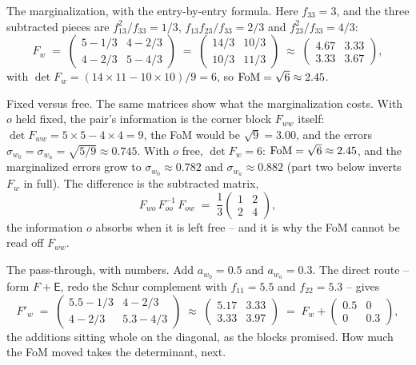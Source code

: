 \documentclass[11pt]{article}
\begin{document}
The marginalization, with the entry-by-entry formula.  Here
$f_{33} = 3$, and the three subtracted pieces are
$f_{13}^2/f_{33} = 1/3$, $f_{13}f_{23}/f_{33} = 2/3$ and
$f_{23}^2/f_{33} = 4/3$:
\begin{equation*}
  F_w \;=\;
  \begin{pmatrix} 5 - 1/3 & 4 - 2/3 \\ 4 - 2/3 & 5 - 4/3 \end{pmatrix}
  \;=\;
  \begin{pmatrix} 14/3 & 10/3 \\ 10/3 & 11/3 \end{pmatrix}
  \;\approx\;
  \begin{pmatrix} 4.67 & 3.33 \\ 3.33 & 3.67 \end{pmatrix} ,
\end{equation*}
with $\det F_w = (14 \times 11 - 10 \times 10)/9 = 6$, so
${\rm FoM} = \sqrt{6} \approx 2.45$.

Fixed versus free.  The same matrices show what the marginalization
costs.  With $o$ held fixed, the pair's information is the corner
block $F_{ww}$ itself: $\det F_{ww} = 5 \times 5 - 4 \times 4 = 9$,
the FoM would be $\sqrt{9} = 3.00$, and the errors
$\sigma_{w_0} = \sigma_{w_a} = \sqrt{5/9} \approx 0.745$.  With $o$
free, $\det F_w = 6$: ${\rm FoM} = \sqrt{6} \approx 2.45$, and the
marginalized errors grow to $\sigma_{w_0} \approx 0.782$ and
$\sigma_{w_a} \approx 0.882$ (part two below inverts $F_w$ in full).
The difference is the subtracted matrix,
\begin{equation*}
  F_{wo}\,F_{oo}^{-1}\,F_{ow} \;=\; \frac{1}{3}
  \begin{pmatrix} 1 & 2 \\ 2 & 4 \end{pmatrix} ,
\end{equation*}
the information $o$ absorbs when it is left free -- and it is why the
FoM cannot be read off $F_{ww}$.

The pass-through, with numbers.  Add $a_{w_0} = 0.5$ and
$a_{w_a} = 0.3$.  The direct route -- form $F + \mathsf{E}$, redo the
Schur complement with $f_{11} = 5.5$ and $f_{22} = 5.3$ -- gives
\begin{equation*}
  F'_w \;=\;
  \begin{pmatrix} 5.5 - 1/3 & 4 - 2/3 \\ 4 - 2/3 & 5.3 - 4/3
  \end{pmatrix}
  \;\approx\;
  \begin{pmatrix} 5.17 & 3.33 \\ 3.33 & 3.97 \end{pmatrix}
  \;=\; F_w +
  \begin{pmatrix} 0.5 & 0 \\ 0 & 0.3 \end{pmatrix} ,
\end{equation*}
the additions sitting whole on the diagonal, as the blocks promised.
How much the FoM moved takes the determinant, next.
\end{document}
